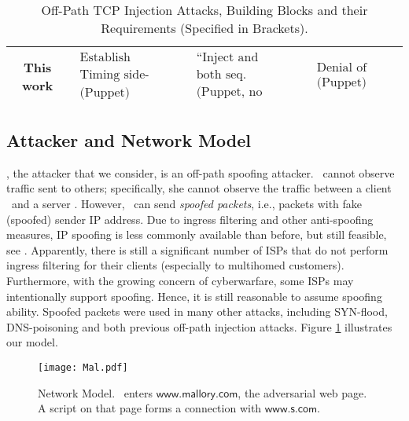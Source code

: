 \documentclass[conference]{IEEEtran}
\newcommand{\scom}{\mbox{$\mathsf{www.s.com}$}}
\newcommand{\malcom}{\mbox{$\mathsf{www.mallory.com}$}}\newcommand{\victimserv}{\mbox{$\mathsf{www.victim\text{\textendash}server.com}$}}\newcommand{\malcoma}{\mbox{$\mathsf{www1.mallory.com}$}}
\begin{document}
\begin{table*}
\begin{tabular}{ c || c | c | c |}
    This work                    & $\begin{array}{c}\text{Establish connection,}\\ \text{Timing side-channel} \\ \text{(Puppet)}\end{array}$
    & $\begin{array}{c}\text{``Inject and Observe'',} \\ \text{both seq. \# obtained} \\ \text{(Puppet, no TLS/SSL)}\end{array}$                        & $\begin{array}{c}\text{Denial of Service} \\ \text{(Puppet)} \end{array}$ \\
    \hline
    
\end{tabular}
\caption{Off-Path TCP Injection Attacks, Building Blocks and their Requirements (Specified in Brackets).}
\label{Tbl:blocks}
\end{table*}




\subsection{Attacker and Network Model} \label{intro:model}

\mal, the attacker that we consider, is an off-path spoofing attacker. \mal\ cannot observe traffic sent to others; specifically, she cannot observe the traffic between a client \wini\ and a server \lin. However, \mal\ can send {\em spoofed packets}, i.e., packets with fake (spoofed) sender IP address. Due to ingress filtering \cite{rfc3013} and other anti-spoofing measures, IP spoofing is less commonly available than before, but still feasible, see \cite{SpooferProject, journals/toit/EhrenkranzL09}. Apparently, there is still a significant number of ISPs that do not perform ingress filtering for their clients (especially to multihomed customers). Furthermore, with the growing concern of cyberwarfare, some ISPs may intentionally support spoofing. Hence, it is still reasonable to assume spoofing ability. Spoofed packets were used in many other attacks, including SYN-flood, DNS-poisoning and both previous off-path injection attacks. Figure \ref{fig:ourmodel} illustrates our model.

\begin{figure}
  \begin{center}
    \texttt{[image: Mal.pdf]}
  \end{center}
  \caption{Network Model. \wini\ enters \malcom, the adversarial web page. A script on that page forms a connection with \scom.}
   \label{fig:ourmodel}
\end{figure}
\end{document}
